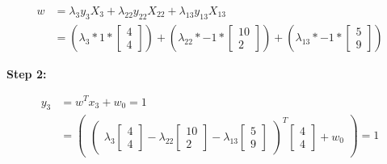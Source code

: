 \documentclass[12pt]{report}
\begin{document}
\begin{equation*}
	\begin{aligned}
		w & = \lambda_{3}y_{3}X_{3} + \lambda_{22}y_{22}X_{22} + \lambda_{13}y_{13}X_{13}                                   \\
		  & = (\lambda_{3} * 1 * \begin{bmatrix}
			                         4 \\
			                         4
		                         \end{bmatrix}) + (\lambda_{22} * -1 * \begin{bmatrix}
			                                                               10 \\
			                                                               2
		                                                               \end{bmatrix}) + (\lambda_{13} * -1 * \begin{bmatrix}
			                                                                                                     5 \\
			                                                                                                     9
		                                                                                                     \end{bmatrix})
	\end{aligned}
\end{equation*}

\vspace{20pt}
\textbf{Step 2:}

\begin{equation*}
	\begin{aligned}
		y_{3} & =  w^T x_{3} + w_{0} = 1            \\
		      & = \begin{pmatrix}
			          \begin{pmatrix}
				\lambda_{3}\begin{bmatrix}
					           4 \\
					           4
				           \end{bmatrix} -

				\lambda_{22}\begin{bmatrix}
					            10 \\
					            2
				            \end{bmatrix}
				-

				\lambda_{13}\begin{bmatrix}
					            5 \\
					            9
				            \end{bmatrix}
			\end{pmatrix}  ^ T
			          \begin{bmatrix}
				4 \\
				4
			\end{bmatrix} + w_{0}
		          \end{pmatrix} = 1
	\end{aligned}
\end{equation*}
\end{document}
